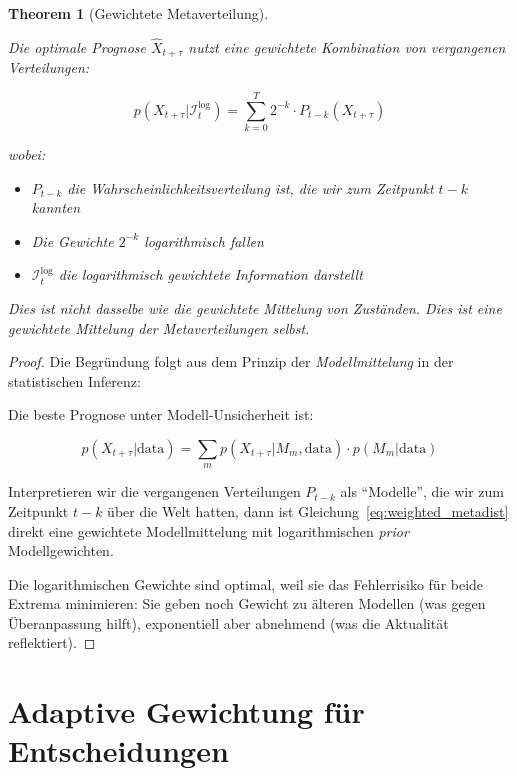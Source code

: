 \documentclass[12pt, a4paper, titlepage]{report}
\newtheorem{theorem}{Theorem}[section]
\theoremstyle{definition}
\theoremstyle{remark}
\begin{document}
\begin{theorem}[Gewichtete Metaverteilung]
\label{thm:weighted_metadistribution}

Die optimale Prognose $\hat{X}_{t+\tau}$ nutzt eine gewichtete Kombination von vergangenen Verteilungen:

\begin{equation}
p(X_{t+\tau} | \mathcal{I}_t^{\log}) = \sum_{k=0}^{T} 2^{-k} \cdot P_{t-k}(X_{t+\tau})
\label{eq:weighted_metadist}
\end{equation}

wobei:
\begin{itemize}
  \item $P_{t-k}$ die Wahrscheinlichkeitsverteilung ist, die wir zum Zeitpunkt $t-k$ kannten
  \item Die Gewichte $2^{-k}$ logarithmisch fallen
  \item $\mathcal{I}_t^{\log}$ die logarithmisch gewichtete Information darstellt
\end{itemize}

Dies ist \emph{nicht} dasselbe wie die gewichtete Mittelung von Zuständen. Dies ist eine gewichtete Mittelung der Metaverteilungen selbst.
\end{theorem}

\begin{proof}
Die Begründung folgt aus dem Prinzip der \emph{Modellmittelung} in der statistischen Inferenz:

Die beste Prognose unter Modell-Unsicherheit ist:

\begin{equation}
p(X_{t+\tau} | \text{data}) = \sum_m p(X_{t+\tau} | M_m, \text{data}) \cdot p(M_m | \text{data})
\label{eq:model_averaging}
\end{equation}

Interpretieren wir die vergangenen Verteilungen $P_{t-k}$ als ``Modelle'', die wir zum Zeitpunkt $t-k$ über die Welt hatten, dann ist Gleichung~\ref{eq:weighted_metadist} direkt eine gewichtete Modellmittelung mit logarithmischen \emph{prior} Modellgewichten.

Die logarithmischen Gewichte sind optimal, weil sie das Fehlerrisiko für beide Extrema minimieren: Sie geben noch Gewicht zu älteren Modellen (was gegen Überanpassung hilft), exponentiell aber abnehmend (was die Aktualität reflektiert).
\end{proof}

\section{Adaptive Gewichtung für Entscheidungen}
\end{document}
